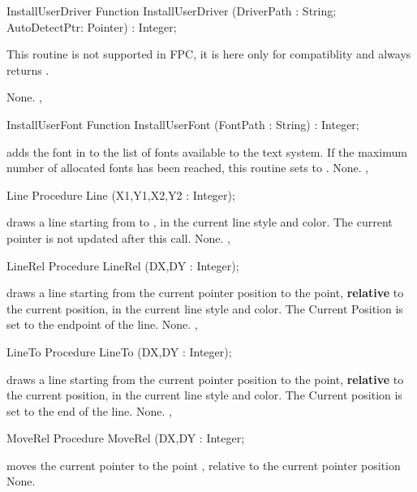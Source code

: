 \begin{function}{InstallUserDriver}
\Declaration
Function InstallUserDriver (DriverPath : String; AutoDetectPtr: Pointer) : Integer;

\Description
This routine is not supported in FPC, it is here only for compatiblity and
always returns .

\Errors
None.
\SeeAlso
{}, 
\end{function}
\begin{function}{InstallUserFont}
\Declaration
Function InstallUserFont (FontPath : String) : Integer;

\Description
{} adds the font in  to the list of fonts
available to the text system. If the maximum number of allocated fonts has
been reached, this routine sets  to .
\Errors
None.
\SeeAlso
{}, 
\end{function}
\begin{procedure}{Line}
\Declaration
Procedure Line (X1,Y1,X2,Y2 : Integer);

\Description
{} draws a line starting from
 to , in the current line style and color.
The current pointer is not updated after this call.
\Errors
None.
\SeeAlso
{},
\end{procedure}
\begin{procedure}{LineRel}
\Declaration
Procedure LineRel (DX,DY : Integer);

\Description
{} draws a line starting from
the current pointer position to the point, \textbf{relative} to the
current position, in the current line style and color. The Current Position
is set to the endpoint of the line.
\Errors
None.
\SeeAlso
{}, 
\end{procedure}
\begin{procedure}{LineTo}
\Declaration
Procedure LineTo (DX,DY : Integer);

\Description
{} draws a line starting from
the current pointer position to the point, \textbf{relative} to the
current position, in the current line style and color. The Current position
is set to the end of the line.
\Errors
None.
\SeeAlso
{},
\end{procedure}
\begin{procedure}{MoveRel}
\Declaration
Procedure MoveRel (DX,DY : Integer;

\Description
{} moves the current pointer to the
point , relative to the current pointer
position
\Errors
None.
\SeeAlso
{}
\end{procedure}
